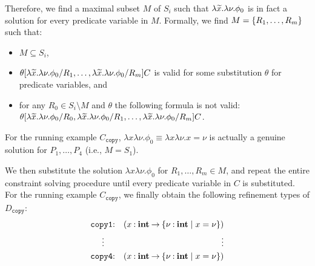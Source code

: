 Therefore, we find a maximal subset \(M\) of \(S_i\) such that 
\(\lambda\widetilde{x}.\lambda \nu.\phi_0\) is in fact a solution for every 
predicate variable in \(M\).  Formally, we find \(M=\{{R_1,\dots,R_m}\}\) 
such that:
\begin{itemize}
\item \(M \subseteq S_i\),
\item \(\theta[\lambda\widetilde{x}.\lambda 
\nu.\phi_0/R_1,\dots,\lambda\widetilde{x}.\lambda \nu.\phi_0/R_m]C\) is valid 
for some substitution \(\theta\) for predicate variables, and
\item for any \(R_0 \in S_i \setminus M\) and \(\theta\) the following 
formula is not valid: \(\theta[\lambda\widetilde{x}.\lambda 
\nu.\phi_0/R_0,\lambda\widetilde{x}.\lambda 
\nu.\phi_0/R_1,\dots,\lambda\widetilde{x}.\lambda \nu.\phi_0/R_m]C\).
\end{itemize}
For the running example \(C_{\texttt{copy}}\), \(\lambda x \lambda 
\nu.\phi_0 \equiv \lambda x \lambda \nu.x=\nu\) is actually a genuine 
solution for \(P_1,\dots,P_4\) (i.e., \(M=S_1\)).

We then substitute the solution \(\lambda x \lambda \nu.\phi_0\) for 
\(R_1,\dots,R_m \in M\), and repeat the entire constraint solving 
procedure until every predicate variable in \(C\) is substituted.  For 
the running example \(C_{\texttt{copy}}\), we finally obtain the 
following refinement types of \(D_{\texttt{copy}}\):
\begin{eqnarray*}
\texttt{copy1}&\mathbin{:}&(x\mathbin{:}{\mathbf{int}}\mathbin{\rightarrow}{\{{\nu\mathbin{:}\mathbf{int} \mid x=\nu}\}}) \\
\vdots\quad &&\qquad\qquad \vdots \\
\texttt{copy4}&\mathbin{:}&(x\mathbin{:}{\mathbf{int}}\mathbin{\rightarrow}{\{{\nu\mathbin{:}\mathbf{int} \mid x=\nu}\}})
\end{eqnarray*}


%
